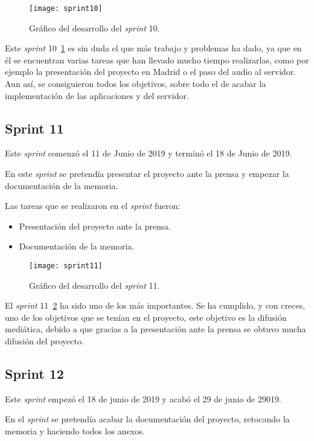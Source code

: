 \begin{figure}
	\centering
	\texttt{[image: sprint10]}
	\caption{Gráfico del desarrollo del \textit{sprint} 10.}
	\label{fig:sprint10}
\end{figure}

Este \textit{sprint} 10~\ref{fig:sprint10} es sin duda el que más trabajo y problemas ha dado, ya que en él se encuentran varias tareas que han llevado mucho tiempo realizarlas, como por ejemplo la presentación del proyecto en Madrid o el paso del audio al servidor. Aun así, se consiguieron todos los objetivos, sobre todo el de acabar la implementación de las aplicaciones y del servidor.

\subsection{Sprint 11}
Este \textit{sprint} comenzó el 11 de Junio de 2019 y terminó el 18 de Junio de 2019.

En este \textit{sprint} se pretendía presentar el proyecto ante la prensa y empezar la documentación de la memoria.

Las tareas que se realizaron en el \textit{sprint} fueron:
\begin{itemize}
	\item Presentación del proyecto ante la prensa.
	\item Documentación de la memoria.
\end{itemize}

\begin{figure}
	\centering
	\texttt{[image: sprint11]}
	\caption{Gráfico del desarrollo del \textit{sprint} 11.}
	\label{fig:sprint11}
\end{figure}

El \textit{sprint} 11~\ref{fig:sprint11} ha sido uno de los más importantes. Se ha cumplido, y con creces, uno de los objetivos que se tenían en el proyecto, este objetivo es la difusión mediática, debido a que gracias a la presentación ante la prensa se obtuvo mucha difusión del proyecto.

\subsection{Sprint 12}
Este \textit{sprint} empezó el 18 de junio de 2019 y acabó el 29 de junio de 29019.

En el \textit{sprint} se pretendía acabar la documentación del proyecto, retocando la memoria y haciendo todos los anexos.

